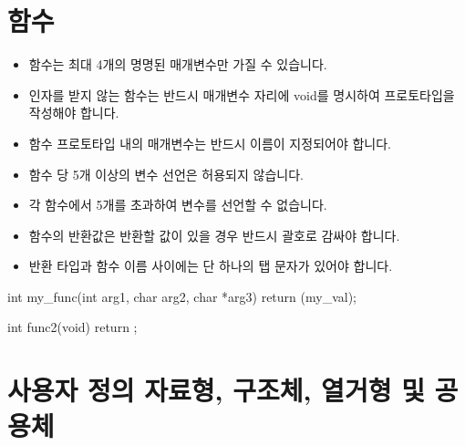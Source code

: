 \documentclass{42-ko}
\begin{document}
    \section{함수}

        \begin{itemize}

            \item 함수는 최대 4개의 명명된 매개변수만 가질 수 있습니다.

            \item 인자를 받지 않는 함수는 반드시 매개변수 자리에 void를 명시하여 
              프로토타입을 작성해야 합니다.

            \item 함수 프로토타입 내의 매개변수는 반드시 이름이 지정되어야 합니다.

            \item 함수 당 5개 이상의 변수 선언은 허용되지 않습니다.

            \item 각 함수에서 5개를 초과하여 변수를 선언할 수 없습니다.

            \item 함수의 반환값은 반환할 값이 있을 경우 반드시 괄호로 감싸야 합니다.

            \item 반환 타입과 함수 이름 사이에는 단 하나의 탭 문자가 있어야 합니다.
        
        \end{itemize}

\vspace{1cm}

            \begin{42ccode}
int my_func(int arg1, char arg2, char *arg3)
{
    return (my_val);
}

int func2(void)
{
    return ;
}
            \end{42ccode}

        \newpage


    \section{사용자 정의 자료형, 구조체, 열거형 및 공용체}
\end{document}
